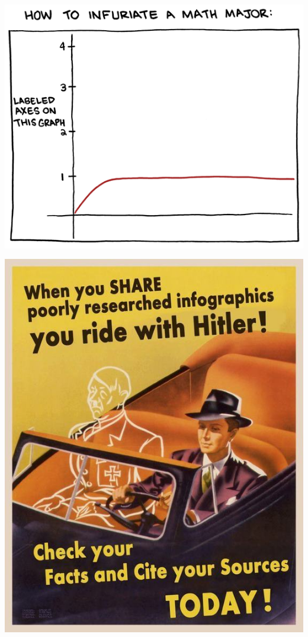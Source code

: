 \documentclass{beamer}
\begin{document}
\begin{frame}
  \begin{center}
    \includegraphics[height = 0.8\textheight, keepaspectratio = true]{figure/trick}
  \end{center}
\end{frame}

\begin{frame}
  \begin{center}
    \includegraphics[height = \textheight, keepaspectration = true]{figure/ride_hitler}
  \end{center}
\end{frame}
\end{document}

